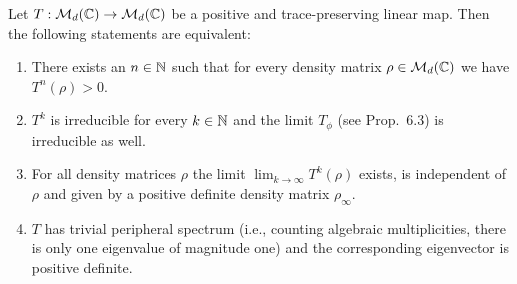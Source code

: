\documentclass[11pt,a4paper]{article}
\theoremstyle{plain}
\theoremstyle{definition}
\theoremstyle{remark}
\begin{document}
\begin{theorem}
    Let $T:\mathcal{M}_d(\mathbb{C})\to\mathcal{M}_d(\mathbb{C})$ be a positive and trace-preserving linear map.
    Then the following statements are equivalent:
    \begin{enumerate}
        \item There exists an $n\in\mathbb{N}$ such that for every density matrix
              $\rho\in\mathcal{M}_d(\mathbb{C})$ we have $T^n(\rho)>0$.
        \item $T^k$ is irreducible for every $k\in\mathbb{N}$ and the limit $T_\phi$
              (see Prop.~6.3) is irreducible as well.
        \item For all density matrices $\rho$ the limit $\lim_{k\to\infty} T^k(\rho)$
              exists, is independent of $\rho$ and given by a positive definite density
              matrix $\rho_\infty$.
        \item $T$ has trivial peripheral spectrum (i.e., counting algebraic
              multiplicities, there is only one eigenvalue of magnitude one) and the
              corresponding eigenvector is positive definite.
    \end{enumerate}
\end{theorem}
\end{document}

